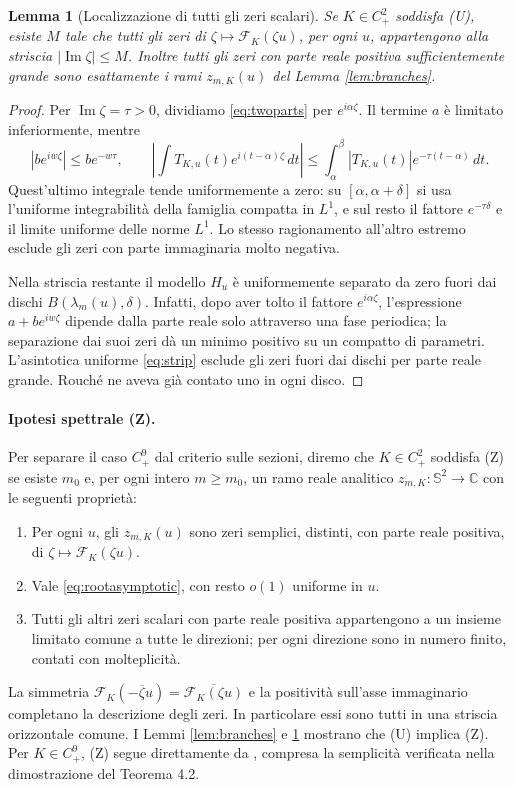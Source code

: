 \documentclass[11pt,a4paper]{article}
\newtheorem{lemma}[theorem]{Lemma}
\theoremstyle{remark}
\newcommand{\Sph}{\mathbb S^2}
\begin{document}
\begin{lemma}[Localizzazione di tutti gli zeri scalari]\label{lem:allzeros}
Se $K\in C^2_+$ soddisfa (U), esiste $M$ tale che tutti gli zeri di
$\zeta\mapsto\mathcal F_K(\zeta u)$, per ogni $u$, appartengono alla
striscia $|\operatorname{Im}\zeta|\leq M$. Inoltre tutti gli zeri con
parte reale positiva sufficientemente grande sono esattamente i rami
$z_{m,K}(u)$ del Lemma \ref{lem:branches}.
\end{lemma}
\begin{proof}
Per $\operatorname{Im}\zeta=\tau>0$, dividiamo \eqref{eq:twoparts} per
$e^{i\alpha\zeta}$. Il termine $a$ è limitato inferiormente, mentre
\[
|b e^{iw\zeta}|\leq b e^{-w\tau},\qquad
\left|\int T_{K,u}(t)e^{i(t-\alpha)\zeta}\,dt\right|
\leq\int_\alpha^\beta |T_{K,u}(t)|e^{-\tau(t-\alpha)}\,dt.
\]
Quest'ultimo integrale tende uniformemente a zero: su
$[\alpha,\alpha+\delta]$ si usa l'uniforme integrabilità della famiglia
compatta in $L^1$, e sul resto il fattore $e^{-\tau\delta}$ e il limite
uniforme delle norme $L^1$. Lo stesso ragionamento all'altro estremo
esclude gli zeri con parte immaginaria molto negativa.

Nella striscia restante il modello $H_u$ è uniformemente separato da
zero fuori dai dischi $B(\lambda_m(u),\delta)$. Infatti, dopo aver tolto
il fattore $e^{i\alpha\zeta}$, l'espressione $a+b e^{iw\zeta}$ dipende
dalla parte reale solo attraverso una fase periodica; la separazione
dai suoi zeri dà un minimo positivo su un compatto di parametri.
L'asintotica uniforme \eqref{eq:strip} esclude gli zeri fuori dai dischi
per parte reale grande. Rouché ne aveva già contato uno in ogni disco.
\end{proof}

\paragraph{Ipotesi spettrale (Z).}
Per separare il caso $C^9_+$ dal criterio sulle sezioni, diremo che
$K\in C^2_+$ soddisfa (Z) se esiste $m_0$ e, per ogni intero
$m\geq m_0$, un ramo reale analitico $z_{m,K}:\Sph\to\mathbb C$
con le seguenti proprietà:
\begin{enumerate}
\item Per ogni $u$, gli $z_{m,K}(u)$ sono zeri semplici, distinti,
      con parte reale positiva, di $\zeta\mapsto\mathcal F_K(\zeta u)$.
\item Vale \eqref{eq:rootasymptotic}, con resto $o(1)$ uniforme in $u$.
\item Tutti gli altri zeri scalari con parte reale positiva
      appartengono a un insieme limitato comune a tutte le direzioni;
      per ogni direzione sono in numero finito, contati con molteplicità.
\end{enumerate}
La simmetria $\mathcal F_K(-\overline\zeta u)=
\overline{\mathcal F_K(\zeta u)}$ e la positività sull'asse immaginario
completano la descrizione degli zeri. In particolare essi sono tutti
in una striscia orizzontale comune. I Lemmi \ref{lem:branches} e
\ref{lem:allzeros} mostrano che (U) implica (Z). Per $K\in C^9_+$,
(Z) segue direttamente da \cite[Teoremi 4.1--4.2]{B16}, compresa la
semplicità verificata nella dimostrazione del Teorema 4.2.
\end{document}

